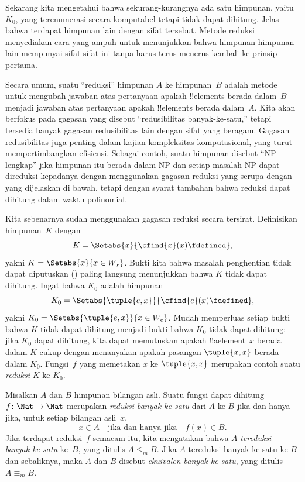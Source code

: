 \documentclass[../../../include/open-logic-section]{subfiles}
\begin{document}

\begin{explain}
Sekarang kita mengetahui bahwa sekurang-kurangnya ada satu himpunan, yaitu
$K_0$, yang terenumerasi secara komputabel tetapi tidak dapat dihitung. Jelas
bahwa terdapat himpunan lain dengan sifat tersebut. Metode reduksi menyediakan
cara yang ampuh untuk menunjukkan bahwa himpunan-himpunan lain mempunyai
sifat-sifat ini tanpa harus terus-menerus kembali ke prinsip pertama.

Secara umum, suatu ``reduksi'' himpunan $A$ ke himpunan~$B$ adalah metode untuk
mengubah jawaban atas pertanyaan apakah !!{element}s berada dalam~$B$ menjadi
jawaban atas pertanyaan apakah !!{element}s berada dalam~$A$. Kita akan
berfokus pada gagasan yang disebut ``redusibilitas banyak-ke-satu,'' tetapi
tersedia banyak gagasan redusibilitas lain dengan sifat yang beragam. Gagasan
redusibilitas juga penting dalam kajian kompleksitas komputasional, yang turut
mempertimbangkan efisiensi. Sebagai contoh, suatu himpunan disebut
``NP-lengkap'' jika himpunan itu berada dalam NP dan setiap masalah NP dapat
direduksi kepadanya dengan menggunakan gagasan reduksi yang serupa dengan yang
dijelaskan di bawah, tetapi dengan syarat tambahan bahwa reduksi dapat dihitung
dalam waktu polinomial.

Kita sebenarnya sudah menggunakan gagasan reduksi secara tersirat. Definisikan
himpunan~$K$ dengan
\[
K = \Setabs{x}{\cfind{x}(x) \fdefined},
\]
yakni $K = \Setabs{x}{x \in W_x}$. Bukti kita bahwa masalah penghentian tidak
dapat diputuskan () paling langsung menunjukkan
bahwa $K$ tidak dapat dihitung. Ingat bahwa $K_0$ adalah himpunan
\[
K_0 = \Setabs{\tuple{e, x}}{\cfind{e}(x) \fdefined },
\]
yakni $K_0 = \Setabs{\tuple{e,x}}{x \in W_e}$. Mudah memperluas setiap bukti
bahwa $K$ tidak dapat dihitung menjadi bukti bahwa $K_0$ tidak dapat dihitung:
jika $K_0$ dapat dihitung, kita dapat memutuskan apakah !!a{element}~$x$
berada dalam $K$ cukup dengan menanyakan apakah pasangan $\tuple{x, x}$ berada
dalam $K_0$. Fungsi~$f$ yang memetakan $x$ ke $\tuple{x, x}$ merupakan contoh
suatu \emph{reduksi} $K$ ke $K_0$.
\end{explain}

\begin{defn}
Misalkan $A$ dan $B$ himpunan bilangan asli. Suatu fungsi dapat dihitung
$f\colon \Nat \to \Nat$ merupakan \emph{reduksi banyak-ke-satu} dari $A$ ke
$B$ jika dan hanya jika, untuk setiap bilangan asli~$x$,
\[
x \in A \quad \text{jika dan hanya jika} \quad f(x) \in B.
\]
Jika terdapat reduksi~$f$ semacam itu, kita mengatakan bahwa $A$
\emph{tereduksi banyak-ke-satu} ke~$B$, yang ditulis $A \leq_m B$. Jika $A$
tereduksi banyak-ke-satu ke $B$ dan sebaliknya, maka $A$ dan $B$ disebut
\emph{ekuivalen banyak-ke-satu}, yang ditulis $A \equiv_m B$.
\end{defn}
\end{document}
